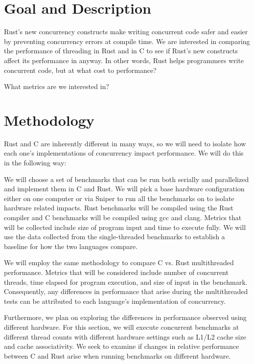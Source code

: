 \documentclass{article}
\begin{document}
\section*{Goal and Description}

Rust's new concurrency constructs make writing concurrent code safer and easier by preventing concurrency errors at compile time. We are interested in comparing the performance of threading in Rust and in C to see if Rust's new constructs affect its performance in anyway. In other words, Rust helps programmers write concurrent code, but at what cost to performance?

What metrics are we interested in?


\section*{Methodology}

Rust and C are inherently different in many ways, so we will need to isolate how each one's implementations of concurrency impact performance. We will do this in the following way:

We will choose a set of benchmarks that can be run both serially and parallelized and implement them in C and Rust. We will pick a base hardware configuration either on one computer or via Sniper to run all the benchmarks on to isolate hardware related impacts. Rust benchmarks will be compiled using the Rust compiler and C benchmarks will be compiled using gcc and clang. Metrics that will be collected include size of program input and time to execute fully. We will use the data collected from the single-threaded benchmarks to establish a baseline for how the two languages compare. 

We will employ the same methodology to compare C vs. Rust multithreaded performance. Metrics that will be considered include number of concurrent threads, time elapsed for program execution, and size of input in the benchmark. Consequently, any differences in performance that arise during the multithreaded tests can be attributed to each language's implementation of concurrency. 


Furthermore, we plan on exploring the differences in performance observed using different hardware. For this section, we will execute concurrent benchmarks at different thread counts with different hardware settings such as L1/L2 cache size and cache associativity. We seek to examine if changes in relative performance between C and Rust arise when running benchmarks on different hardware. 
\end{document}
